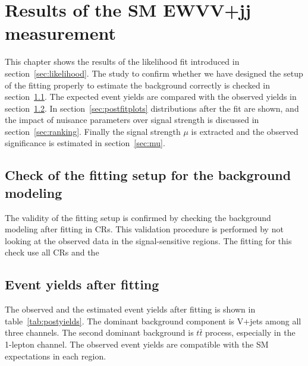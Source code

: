 \chapter{Results of the SM EWVV+jj measurement}
\label{chap:results}
This chapter shows the results of the likelihood fit introduced in section~\ref{sec:likelihood}.
The study to confirm whether we have designed the setup of the fitting properly to estimate the background correctly is checked in section~\ref{sec:confirm}.
The expected event yields are compared with the observed yields in section~\ref{sec:eventyields}.
In section~\ref{sec:postfitplots} distributions after the fit are shown, and the impact of nuisance parameters over signal strength is discussed in section~\ref{sec:ranking}.
Finally the signal strength $\mu$ is extracted and the observed significance is estimated in section~\ref{sec:mu}.

\section{Check of the fitting setup for the background modeling}
\label{sec:confirm}
The validity of the fitting setup is confirmed by checking the background modeling after fitting in CRs.
This validation procedure is performed by not looking at the observed data in the signal-sensitive regions.
The fitting for this check use all CRs and the 




\section{Event yields after fitting}
\label{sec:eventyields}

The observed and the estimated event yields after fitting is shown in table~\ref{tab:postyields}.
The dominant background component is V+jets among all three channels. The second dominant background is $t\bar{t}$ process, especially in the 1-lepton channel. The observed event yields are compatible with the SM expectations in each region.

